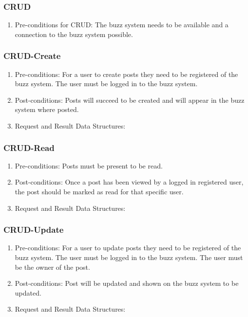 \documentclass[12pt, oneside]{book}
\begin{document}
\subsubsection{CRUD}
\begin{enumerate}
 \item Pre-conditions for CRUD: The buzz system needs to be available and a connection to the buzz system possible. 
\end{enumerate}
\subsubsection{CRUD-Create}
\begin{enumerate}
 \item Pre-conditions: For a user to create posts they need to be registered of the buzz system. The user must be logged in to the buzz system.
 \\
 \item Post-conditions: Posts will succeed to be created and will appear in the buzz system where posted.
  \\
 \item Request and Result Data Structures: 
\end{enumerate}

\subsubsection{CRUD-Read}
\begin{enumerate}
 \item Pre-conditions: Posts must be present to be read.
 \\
 \item Post-conditions: Once a post has been viewed by a logged in registered user, the post should be marked as read for that specific user.
  \\
 \item Request and Result Data Structures:
\end{enumerate}

\subsubsection{CRUD-Update}
\begin{enumerate}
 \item Pre-conditions:  For a user to update posts they need to be registered of the buzz system. The user must be logged in to the buzz system. The user must be the owner of the post.
 \\
 \item Post-conditions: Post will be updated and shown on the buzz system to be updated.
   \\
 \item Request and Result Data Structures:
\end{enumerate}
\end{document}
